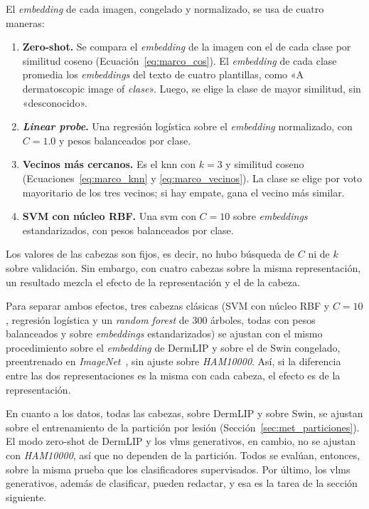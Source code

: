 El \emph{embedding} de cada imagen, congelado y normalizado, se usa de cuatro maneras:
\begin{enumerate}[leftmargin=1.6em]
  \item \textbf{Zero-shot.} Se compara el \emph{embedding} de la imagen con el de cada clase por similitud coseno
  (Ecuación~\ref{eq:marco_cos}). El \emph{embedding} de cada clase promedia los \emph{embeddings} del texto de cuatro plantillas, como
  «A dermatoscopic image of \emph{clase}». Luego, se elige la clase de mayor similitud, sin «desconocido».
  \item \textbf{\emph{Linear probe}.} Una regresión logística sobre el \emph{embedding} normalizado, con $C = 1.0$ y pesos
  balanceados por clase.
  \item \textbf{Vecinos más cercanos.} Es el \gls{knn} con $k = 3$ y similitud coseno (Ecuaciones~\ref{eq:marco_knn} y
  \ref{eq:marco_vecinos}). La clase se elige por voto mayoritario de los tres vecinos; si hay empate, gana el vecino
  más similar.
  \item \textbf{SVM con núcleo RBF.} Una \gls{svm} con $C = 10$ sobre \emph{embeddings} estandarizados, con pesos balanceados
  por clase.
\end{enumerate}
Los valores de las cabezas son fijos, es decir, no hubo búsqueda de $C$ ni de $k$ sobre validación.
Sin embargo, con cuatro cabezas sobre la misma representación, un resultado mezcla el efecto de la representación y el
de la cabeza.

Para separar ambos efectos, tres cabezas clásicas (SVM con núcleo RBF y $C = 10$, regresión logística y un
\emph{random forest} de 300 árboles, todas con pesos balanceados y sobre \emph{embeddings} estandarizados) se ajustan
con el mismo procedimiento sobre el \emph{embedding} de DermLIP y sobre el de Swin congelado, preentrenado en
\emph{ImageNet}~\cite{liu2021swin}, sin ajuste sobre \emph{HAM10000}. Así, si la diferencia entre las dos
representaciones es la misma con cada cabeza, el efecto es de la representación.

En cuanto a los datos, todas las cabezas, sobre DermLIP y sobre Swin, se ajustan sobre el entrenamiento de la partición por lesión
(Sección~\ref{sec:met_particiones}). El modo zero-shot de DermLIP y los \glspl{vlm} generativos, en cambio, no se
ajustan con \emph{HAM10000}, así que no dependen de la partición. Todos se evalúan, entonces, sobre la misma prueba que
los clasificadores supervisados. Por último, los \glspl{vlm} generativos, además de clasificar, pueden redactar, y esa es la tarea de la
sección siguiente.
